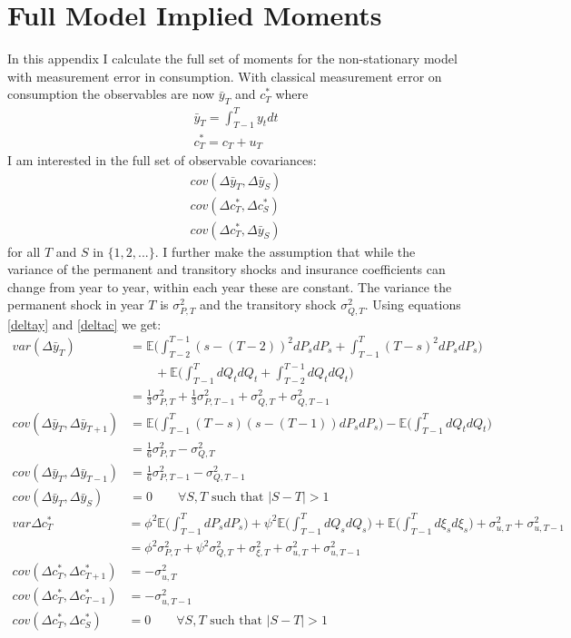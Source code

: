 \section{Full Model Implied Moments}
In this appendix I calculate the full set of moments for the non-stationary model with measurement error in consumption. With classical measurement error on consumption the observables are now $\bar{y}_T$ and $c_T^*$ where
\begin{align*}
\bar{y}_T = \int_{T-1}^{T} y_t dt \\
c_T^* = c_T + u_T
\end{align*}
I am interested in the full set of observable covariances:
\begin{align*}
cov(\Delta \bar{y}_T, \Delta \bar{y}_S) \\
cov(\Delta c_T^*, \Delta c_S^*) \\
cov(\Delta c_T^*,  \Delta \bar{y}_S)
\end{align*}
for all $T$ and $S$ in $\{1,2,...\}$. I further make the assumption that while the variance of the permanent and transitory shocks and insurance coefficients can change from year to year, within each year these are constant. The variance the permanent shock in year $T$ is $\sigma^2_{P,T}$ and the transitory shock $\sigma^2_{Q,T}$. Using equations \ref{deltay} and \ref{deltac} we get:
\begin{align}
var(\Delta \bar{y}_T) &= \mathbb{E} \Big(\int_{T-2}^{T-1} (s-(T-2))^2 dP_s dP_s  + \int_{T-1}^{T} (T-s)^2 dP_s dP_s \Big) \nonumber \\
& \qquad + \mathbb{E} \Big(\int_{T-1}^{T} dQ_t dQ_t +\int_{T-2}^{T-1} dQ_t dQ_t \Big) \nonumber \\
&= \frac{1}{3} \sigma^2_{P,T} + \frac{1}{3} \sigma^2_{P,T-1} +  \sigma^2_{Q,T} +  \sigma^2_{Q,T-1}\\
cov(\Delta \bar{y}_T, \Delta \bar{y}_{T+1}) &=  \mathbb{E} \Big(\int_{T-1}^{T} (T-s)(s-(T-1)) dP_s dP_s  \Big) - \mathbb{E} \Big(\int_{T-1}^{T} dQ_t dQ_t \Big) \nonumber \\
&= \frac{1}{6}\sigma^2_{P,T} - \sigma^2_{Q,T} \\
cov(\Delta \bar{y}_T, \Delta \bar{y}_{T-1}) &= \frac{1}{6}\sigma^2_{P,T-1} - \sigma^2_{Q,T-1} \\
cov(\Delta \bar{y}_T, \Delta \bar{y}_{S}) &= 0 \qquad \forall S,T \text{ such that }|S-T| >1 
\end{align}
\begin{align}
var{\Delta c_T^*} &= \phi^2 \mathbb{E}\Big( \int_{T-1}^{T} dP_s dP_s \Big) + \psi^2 \mathbb{E}\Big( \int_{T-1}^{T} dQ_s dQ_s \Big) + \mathbb{E} \Big( \int_{T-1}^{T} d\xi_s d\xi_s \Big) +  \sigma^2_{u,T} +  \sigma^2_{u,T-1} \nonumber \\
&= \phi^2 \sigma^2_{P,T} + \psi^2 \sigma^2_{Q,T} + \sigma^2_{\xi,T}+\sigma^2_{u,T}+   \sigma^2_{u,T-1}  \\
cov(\Delta c_T^*, \Delta c_{T+1}^*) &= -\sigma^2_{u,T} \\
cov(\Delta c_T^*, \Delta c_{T-1}^*) &= -\sigma^2_{u,T-1} \\
cov(\Delta c_T^*, \Delta c_S^*) &= 0 \qquad \forall S,T \text{ such that }|S-T| >1 
\end{align}
